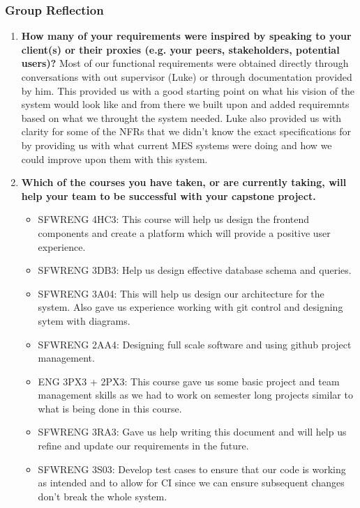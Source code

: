 
\subsubsection*{Group Reflection}
\begin{enumerate}
  \item \textbf{How many of your requirements were inspired by speaking to your client(s) or their proxies (e.g. your peers, stakeholders, potential users)?}
  Most of our functional requirements were obtained directly through conversations with out supervisor (Luke) or through documentation provided by him. This provided us with a good starting point on what his vision of the system would look like and from there we built upon and added requiremnts based on what we throught the system needed. Luke also provided us with clarity for some of the NFRs that we didn't know the exact specifications for by providing us with what current MES systems were doing and how we could improve upon them with this system.

  \item \textbf{Which of the courses you have taken, or are currently taking, will help your team to be successful with your capstone project.}
  \begin{itemize}
      \item SFWRENG 4HC3: This course will help us design the frontend components and create a platform which will provide a positive user experience.
      \item SFWRENG 3DB3: Help us design effective database schema and queries.
      \item SFWRENG 3A04: This will help us design our architecture for the system. Also gave us experience working with git control and designing sytem with diagrams.
      \item SFWRENG 2AA4: Designing full scale software and using github project management.
      \item ENG 3PX3 + 2PX3: This course gave us some basic project and team management skills as we had to work on semester long projects similar to what is being done in this course.
      \item SFWRENG 3RA3: Gave us help writing this document and will help us refine and update our requirements in the future.
      \item SFWRENG 3S03: Develop test cases to ensure that our code is working as intended and to allow for CI since we can ensure subsequent changes don't break the whole system.
  \end{itemize}


\end{enumerate}
